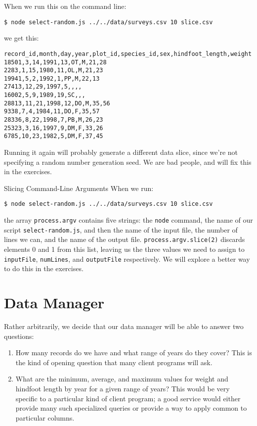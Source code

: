 When we run this on the command line:

\begin{verbatim}
$ node select-random.js ../../data/surveys.csv 10 slice.csv
\end{verbatim}

\noindent
we get this:

\begin{verbatim}
record_id,month,day,year,plot_id,species_id,sex,hindfoot_length,weight
18501,3,14,1991,13,OT,M,21,28
2283,1,15,1980,11,OL,M,21,23
19941,5,2,1992,1,PP,M,22,13
27413,12,29,1997,5,,,,
16002,5,9,1989,19,SC,,,
28813,11,21,1998,12,DO,M,35,56
9338,7,4,1984,11,DO,F,35,57
28336,8,22,1998,7,PB,M,26,23
25323,3,16,1997,9,DM,F,33,26
6785,10,23,1982,5,DM,F,37,45
\end{verbatim}

Running it again will probably generate a different data slice,
since we're not specifying a random number generation seed.
We are bad people, and will fix this in the exercises.

\begin{aside}{Slicing Command-Line Arguments}
  When we run:

\begin{verbatim}
$ node select-random.js ../../data/surveys.csv 10 slice.csv
\end{verbatim}

  the array \texttt{process.argv} contains five strings:
  the \texttt{node} command,
  the name of our script \texttt{select-random.js},
  and then the name of the input file,
  the number of lines we can,
  and the name of the output file.
  \texttt{process.argv.slice(2)} discards elements 0 and 1 from this list,
  leaving us the three values we need to assign to \texttt{inputFile},
  \texttt{numLines},
  and \texttt{outputFile} respectively.
  We will explore a better way to do this in the exercises.
\end{aside}

\section{Data Manager}\label{s:dataman-manager}

Rather arbitrarily,
we decide that our data manager will be able to answer two questions:

\begin{enumerate}
\item
  How many records do we have and what range of years do they cover?
  This is the kind of opening question that many client programs will ask.
\item
  What are the minimum, average, and maximum values
  for weight and hindfoot length by year
  for a given range of years?
  This would be very specific to a particular kind of client program;
  a good service would either provide many such specialized queries
  or provide a way to apply common 
  to particular columns.
\end{enumerate}

